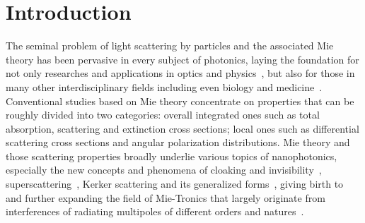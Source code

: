 \documentclass[aps,twocolumn,superscriptaddress]{revtex4-1}
\begin{document}
\maketitle

\section{Introduction}
The seminal problem of light scattering by particles and the associated Mie theory has been pervasive in every subject of photonics, laying the foundation for not only researches and applications in optics and physics~\cite{Bohren1983_book,DOICU_light_2006,GOUESBET_generalized_2011}, but also for those in many other interdisciplinary fields including even biology and medicine~\cite{FERRARI_2005_NatRevCancer_Cancer,DREADEN_2012_Chem.Soc.Rev._golden}. Conventional studies based on Mie theory concentrate on properties that can be roughly divided into two categories: overall integrated ones such as total absorption, scattering and extinction cross sections; local ones such as differential scattering cross sections and angular polarization distributions. Mie theory and those scattering properties broadly underlie various topics of nanophotonics, especially the new concepts and phenomena of cloaking and invisibility~\cite{Alu2009_PRL}, superscattering~\cite{Ruan2010_PRL,QIAN_2019_Phys.Rev.Lett._Experimental}, Kerker scattering and its generalized forms~\cite{Kerker1983_JOSA,LIU_2018_Opt.Express_Generalized}, giving birth to and further expanding the field of Mie-Tronics that largely originate from interferences of radiating multipoles of different orders and natures~\cite{jahani_alldielectric_2016,KUZNETSOV_Science_optically_2016,WON_2019__Mietronic}.
\end{document}
